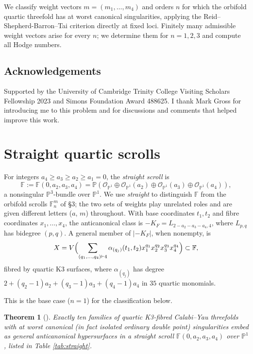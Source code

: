 \documentclass[11pt]{article}
\newtheorem{theorem}{Theorem}[section]
\newcommand{\PP}{\mathbb{P}}
\newcommand{\F}{\mathbb{F}}
\begin{document}
	We classify weight vectors $m=(m_1,\dots,m_4)$ and orders $n$ for which the orbifold quartic threefold has at worst canonical singularities, applying the Reid--Shepherd-Barron--Tai criterion \cite{Reid1980,Reid1985,Tai1982} directly at fixed loci. Finitely many admissible weight vectors arise for every $n$; we determine them for $n=1,2,3$ and compute all Hodge numbers.
	
	\subsection*{Acknowledgements}
	Supported by the University of Cambridge Trinity College Visiting Scholars Fellowship 2023 and Simons Foundation Award 488625. I thank Mark Gross for introducing me to this problem and for discussions and comments that helped improve this work.
	
	\section{Straight quartic scrolls}
	
	For integers $a_4\ge a_3\ge a_2\ge a_1=0$, the \emph{straight scroll} is
	\[
	\F:=\F(0,a_2,a_3,a_4)=\PP(\mathcal{O}_{\PP^1}\oplus\mathcal{O}_{\PP^1}(a_2)\oplus\mathcal{O}_{\PP^1}(a_3)\oplus\mathcal{O}_{\PP^1}(a_4)),
	\]
	a nonsingular $\PP^3$-bundle over $\PP^1$. We use \emph{straight} to distinguish $\F$ from the orbifold scrolls $\F^m_n$ of \S3; the two sets of weights play unrelated roles and are given different letters ($a$, $m$) throughout. With base coordinates $t_1,t_2$ and fibre coordinates $x_1,\dots,x_4$, the anticanonical class is $-K_F=L_{2-a_2-a_3-a_4,4}$, where $L_{p,q}$ has bidegree $(p,q)$. A general member of $|{-}K_F|$, when nonempty, is
	\[
	X=V\Bigl(\sum_{(q_1,\dots,q_4)\vdash 4}\alpha_{(q_j)}(t_1,t_2)x_1^{q_1}x_2^{q_2}x_3^{q_3}x_4^{q_4}\Bigr)\subset\F,
	\]
	fibred by quartic K3 surfaces, where $\alpha_{(q_j)}$ has degree $2+(q_2-1)a_2+(q_3-1)a_3+(q_4-1)a_4$ in $35$ quartic monomials.
	
	This is the base case ($n=1$) for the classification below.
	
	\begin{theorem}[\cite{Mullet2009,MboyaSzendroi2023,Mboya2022}]\label{thm:straight}
		Exactly ten families of quartic K3-fibred Calabi--Yau threefolds with at worst canonical (in fact isolated ordinary double point) singularities embed as general anticanonical hypersurfaces in a straight scroll $\F(0,a_2,a_3,a_4)$ over $\PP^1$, listed in Table \ref{tab:straight}.
	\end{theorem}
	
\end{document}

